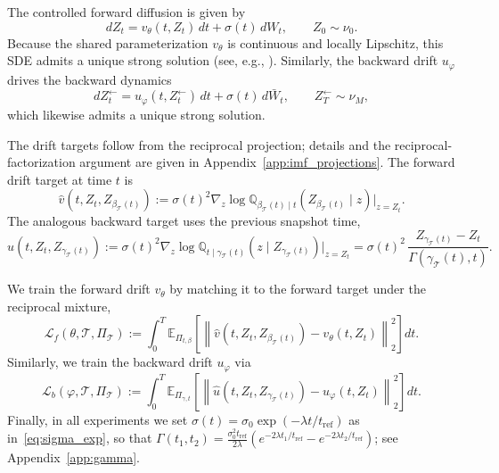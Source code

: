 \documentclass[review,onefignum,onetabnum]{siamart250211}
\newcommand{\1}{\mathbf{1}}
\newcommand{\bphi}{\varphi}
\begin{document}
The controlled forward diffusion is given by
\begin{equation}\label{eq:controlled_sde}
    dZ_t = v_\theta(t,Z_t)\,dt + \sigma(t)\,dW_t,\qquad Z_0\sim\nu_0.
\end{equation}
Because the shared parameterization $v_\theta$ is continuous and locally Lipschitz, this SDE admits a unique strong solution (see, e.g., \cite[Theorem~5.2.9]{karatzas1991brownian}). Similarly, the backward drift $u_\bphi$ drives the backward dynamics
\begin{equation}\label{eq:controlled_sde_backward}
    dZ^{\leftarrow}_t = u_\bphi(t,Z^{\leftarrow}_t)\,dt + \sigma(t)\,d\bar W_t,\qquad Z^{\leftarrow}_T\sim\nu_M,
\end{equation}
which likewise admits a unique strong solution.

The drift targets follow from the reciprocal projection; details and the reciprocal-factorization argument are given in Appendix~\ref{app:imf_projections}. The forward drift target at time $t$ is
\begin{equation}\label{eq:bridge_target}
\widehat v\!\left(t,Z_t,Z_{\beta_{\mathcal{T}}(t)}\right)
:=\sigma(t)^2\nabla_z \log \mathbb{Q}_{\beta_{\mathcal{T}}(t)\mid t}\!\left(Z_{\beta_{\mathcal{T}}(t)}\mid z\right)\Big|_{z=Z_t}.
\end{equation}
The analogous backward target uses the previous snapshot time,
\begin{equation}\label{eq:bridge_target_bwd}
\widehat u\!\left(t,Z_t,Z_{\gamma_{\mathcal{T}}(t)}\right)
:=\sigma(t)^2\nabla_z \log \mathbb{Q}_{t\mid \gamma_{\mathcal{T}}(t)}\!\left(z\mid Z_{\gamma_{\mathcal{T}}(t)}\right)\Big|_{z=Z_t}
= \sigma(t)^2\,\frac{Z_{\gamma_{\mathcal{T}}(t)}-Z_t}{\Gamma(\gamma_{\mathcal{T}}(t),t)}.
\end{equation}

We train the forward drift $v_\theta$ by matching it to the forward target under the reciprocal mixture,
\begin{equation}\label{eq:msbm_ls_forward}
\mathcal{L}_f(\theta,\mathcal{T},\Pi_{\mathcal{T}})
:=\int_0^T \mathbb{E}_{\Pi_{t,\beta}}\!\left[
\left\|\widehat v\!\left(t,Z_t,Z_{\beta_{\mathcal{T}}(t)}\right)-v_\theta(t,Z_t)\right\|_2^2
\right]dt.
\end{equation}
Similarly, we train the backward drift $u_\bphi$ via
\begin{equation}\label{eq:msbm_ls_backward}
\mathcal{L}_b(\bphi,\mathcal{T},\Pi_{\mathcal{T}})
:=\int_0^T \mathbb{E}_{\Pi_{\gamma,t}}\!\left[
\left\|\widehat u\!\left(t,Z_t,Z_{\gamma_{\mathcal{T}}(t)}\right)-u_\bphi(t,Z_t)\right\|_2^2
\right]dt.
\end{equation}
Finally, in all experiments we set $\sigma(t)=\sigma_0\exp\!\left(-\lambda t/t_{\mathrm{ref}}\right)$ as in~\eqref{eq:sigma_exp}, so that $\Gamma(t_1,t_2)=\frac{\sigma_0^2 t_{\mathrm{ref}}}{2\lambda}\left(e^{-2\lambda t_1/t_{\mathrm{ref}}}-e^{-2\lambda t_2/t_{\mathrm{ref}}}\right)$; see Appendix~\ref{app:gamma}.
\end{document}

